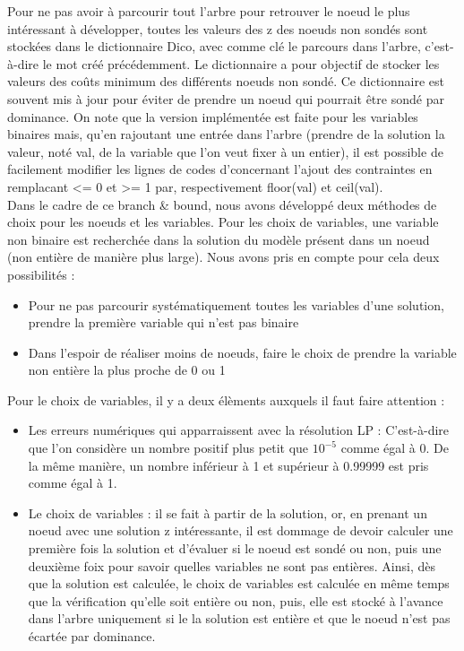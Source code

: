 \documentclass[a4paper,10pt]{article}
\begin{document}
Pour ne pas avoir à parcourir tout l'arbre pour retrouver le noeud le plus intéressant à développer, toutes les valeurs des z des noeuds non sondés sont stockées dans le dictionnaire Dico, avec comme clé le parcours dans l'arbre, c'est-à-dire le mot créé précédemment.
Le dictionnaire a pour objectif de stocker les valeurs des coûts minimum des différents noeuds non sondé. Ce dictionnaire est souvent mis à jour pour éviter de prendre un noeud qui pourrait être sondé par dominance. On note que la version implémentée est faite pour les variables binaires mais, qu'en rajoutant une entrée dans l'arbre (prendre de la solution la valeur, noté val, de la variable que l'on veut fixer à un entier), il est possible de facilement modifier les lignes de codes d'concernant l'ajout des contraintes en remplacant <= 0 et >= 1 par, respectivement floor(val) et ceil(val). \\

Dans le cadre de ce branch \& bound, nous avons développé deux méthodes de choix pour les noeuds et les variables. 
Pour les choix de variables, une variable non binaire est recherchée dans la solution du modèle présent dans un noeud (non entière de manière plus large). Nous avons pris en compte pour cela deux possibilités :
\begin{itemize}
\item Pour ne pas parcourir systématiquement toutes les variables d'une solution, prendre la première variable qui n'est pas binaire 
\item Dans l'espoir de réaliser moins de noeuds, faire le choix de prendre la variable non entière la plus proche de 0 ou 1
\end{itemize}

Pour le choix de variables, il y a deux élèments auxquels il faut faire attention :
\begin{itemize}
\item Les erreurs numériques qui apparraissent avec la résolution LP : C'est-à-dire que l'on considère un nombre positif plus petit que $10^{-5}$ comme égal à 0. De la même manière, un nombre inférieur à 1 et supérieur à 0.99999 est pris comme égal à 1.
\item Le choix de variables : il se fait à partir de la solution, or, en prenant un noeud avec une solution z intéressante, il est dommage de devoir calculer une première fois la solution et d'évaluer si le noeud est sondé ou non, puis une deuxième foix pour savoir quelles variables ne sont pas entières. Ainsi, dès que la solution est calculée, le choix de variables est calculée en même temps que la vérification qu'elle soit entière ou non, puis, elle est stocké à l'avance dans l'arbre uniquement si le la solution est entière et que le noeud n'est pas écartée par dominance.
\end{itemize} 
\end{document}
